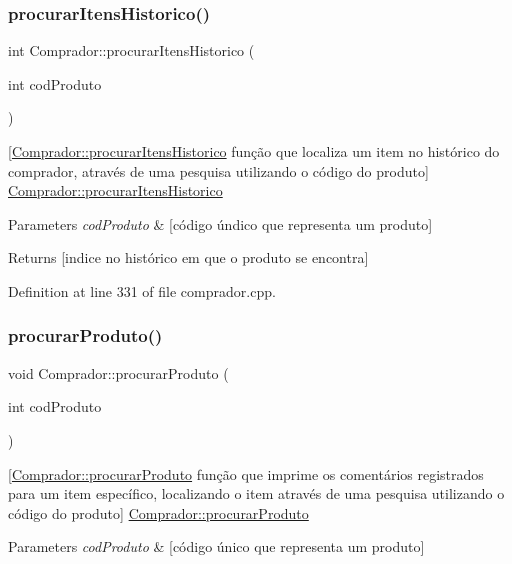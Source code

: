 \subsubsection{\texorpdfstring{procurar\+Itens\+Historico()}{procurarItensHistorico()}}
{\footnotesize\ttfamily int Comprador\+::procurar\+Itens\+Historico (\begin{DoxyParamCaption}\item[{int}]{cod\+Produto }\end{DoxyParamCaption})}

\mbox{[}\hyperlink{class_comprador_a0ebab4be27f71b04734794765d661529}{Comprador\+::procurar\+Itens\+Historico} função que localiza um item no histórico do comprador, através de uma pesquisa utilizando o código do produto\mbox{]}  \hyperlink{class_comprador_a0ebab4be27f71b04734794765d661529}{Comprador\+::procurar\+Itens\+Historico} 
\begin{DoxyParams}{Parameters}
{\em cod\+Produto} & \mbox{[}código úndico que representa um produto\mbox{]} \\
\hline
\end{DoxyParams}
\begin{DoxyReturn}{Returns}
\mbox{[}indice no histórico em que o produto se encontra\mbox{]} 
\end{DoxyReturn}


Definition at line 331 of file comprador.\+cpp.

\mbox{\label{class_comprador_a05415fa7c875440e86d5781f04577572}} 
\subsubsection{\texorpdfstring{procurar\+Produto()}{procurarProduto()}}
{\footnotesize\ttfamily void Comprador\+::procurar\+Produto (\begin{DoxyParamCaption}\item[{int}]{cod\+Produto }\end{DoxyParamCaption})}

\mbox{[}\hyperlink{class_comprador_a05415fa7c875440e86d5781f04577572}{Comprador\+::procurar\+Produto} função que imprime os comentários registrados para um item específico, localizando o item através de uma pesquisa utilizando o código do produto\mbox{]}  \hyperlink{class_comprador_a05415fa7c875440e86d5781f04577572}{Comprador\+::procurar\+Produto} 
\begin{DoxyParams}{Parameters}
{\em cod\+Produto} & \mbox{[}código único que representa um produto\mbox{]} \\
\hline
\end{DoxyParams}


